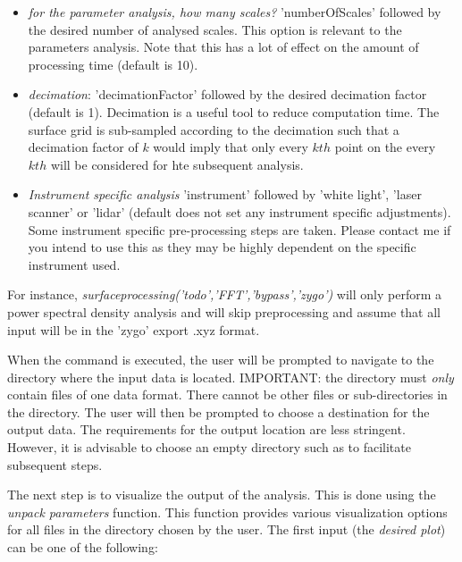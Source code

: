\documentclass[12pt,a4paper]{article}
\begin{document}
\begin{itemize}
\begin{itemize}
\item \textit{for the parameter analysis, how many scales?} 'numberOfScales' followed by the desired number of analysed scales. This option is relevant to the parameters analysis. Note that this has a lot of effect on the amount of processing time (default is 10).

\item \textit{decimation}: 'decimationFactor' followed by the desired decimation factor (default is 1). Decimation is a useful tool to reduce computation time. The surface grid is sub-sampled according to the decimation such that a decimation factor of $k$ would imply that only every $kth$ point on the every $kth$ will be considered for hte subsequent analysis.

\item \textit{Instrument specific analysis} 'instrument' followed by 'white light', 'laser scanner' or 'lidar' (default does not set any instrument specific adjustments). Some instrument specific pre-processing steps are taken. Please contact me if you intend to use this as they may be highly dependent on the specific instrument used.
	 
\end{itemize}

For instance, \textit{surfaceprocessing('todo','FFT','bypass','zygo')} will only perform a power spectral density analysis and will skip preprocessing and assume that all input will be in the 'zygo' export .xyz format.

When the command is executed, the user will be prompted to navigate to the directory where the input data is located. IMPORTANT: the directory must \textit{only} contain files of one data format. There cannot be other files or sub-directories in the directory. The user will then be prompted to choose a destination for the output data. The requirements for the output location are less stringent. However, it is advisable to choose an empty directory such as to facilitate subsequent steps.

The next step is to visualize the output of the analysis. This is done using the \textit{unpack parameters} function. This function provides various visualization options for all files in the directory chosen by the user. The first input (the \textit{desired plot}) can be one of the following:


\end{itemize}
\end{document}
